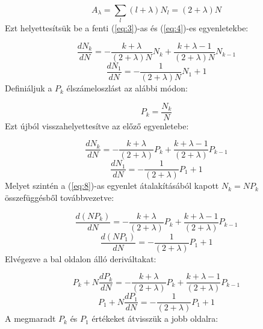 \begin{equation} \label{eq:5}
    A_{\lambda}
    =
    \sum_{l} \left( l + \lambda \right) N_{l}
    =
    \left( 2 + \lambda \right) N
\end{equation}
Ezt helyettesítsük be a fenti (\ref{eq:3})-as és (\ref{eq:4})-es egyenletekbe:

\begin{equation} \label{eq:6}
    \frac{d N_{k}}{dN}
    =
    -\frac{k + \lambda}{\left( 2 + \lambda \right) N} N_{k} + \frac{k + \lambda - 1}{\left( 2 + \lambda \right) N} N_{k-1}
\end{equation}
\begin{equation} \label{eq:7}
    \frac{d N_{1}}{dN}
    =
    -\frac{1}{\left( 2 + \lambda \right) N} N_{1} + 1
\end{equation}
Definiáljuk a $P_{k}$ élszámeloszlást az alábbi módon:

\begin{equation} \label{eq:8}
    P_{k}
    =
    \frac{N_{k}}{N}
\end{equation}
Ezt újból visszahelyettesítve az előző egyenletebe:

\begin{equation} \label{eq:9}
    \frac{d N_{k}}{dN}
    =
    -\frac{k + \lambda}{\left( 2 + \lambda \right)} P_{k} + \frac{k + \lambda - 1}{\left( 2 + \lambda \right)} P_{k-1}
\end{equation}
\begin{equation} \label{eq:10}
    \frac{d N_{1}}{dN}
    =
    -\frac{1}{\left( 2 + \lambda \right)} P_{1} + 1
\end{equation}
Melyet szintén a (\ref{eq:8})-as egyenlet átalakításából kapott $N_{k} = N P_{k}$ összefüggésből továbbvezetve:

\begin{equation} \label{eq:11}
    \frac{d \left( N P_{k} \right)}{dN}
    =
    -\frac{k + \lambda}{\left( 2 + \lambda \right)} P_{k} + \frac{k + \lambda - 1}{\left( 2 + \lambda \right)} P_{k-1}
\end{equation}
\begin{equation} \label{eq:12}
    \frac{d \left( N P_{1} \right)}{dN}
    =
    -\frac{1}{\left( 2 + \lambda \right)} P_{1} + 1
\end{equation}
Elvégezve a bal oldalon álló deriváltakat:

\begin{equation} \label{eq:13}
    P_{k} + N \frac{d P_{k}}{dN}
    =
    -\frac{k + \lambda}{\left( 2 + \lambda \right)} P_{k} + \frac{k + \lambda - 1}{\left( 2 + \lambda \right)} P_{k-1}
\end{equation}
\begin{equation} \label{eq:14}
    P_{1} + N \frac{d P_{1}}{dN}
    =
    -\frac{1}{\left( 2 + \lambda \right)} P_{1} + 1
\end{equation}
A megmaradt $P_{k}$ és $P_{1}$ értékeket átvisszük a jobb oldalra:

